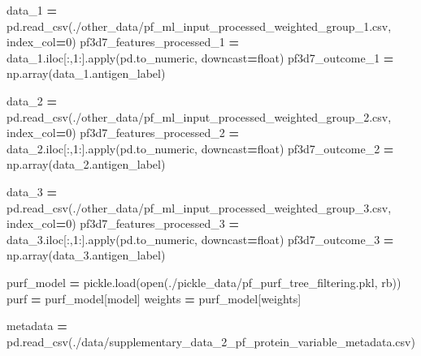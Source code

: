 \documentclass[
  11pt,
  oneside]{book}
\newenvironment{Shaded}{\begin{snugshade}}{\end{snugshade}}
\newcommand{\BuiltInTok}[1]{#1}
\newcommand{\DecValTok}[1]{\textcolor[rgb]{0.00,0.00,0.81}{#1}}
\newcommand{\NormalTok}[1]{#1}
\newcommand{\OperatorTok}[1]{\textcolor[rgb]{0.81,0.36,0.00}{\textbf{#1}}}
\newcommand{\StringTok}[1]{\textcolor[rgb]{0.31,0.60,0.02}{#1}}
\begin{document}
\begin{Shaded}
\begin{Highlighting}[]
\NormalTok{data\_1 }\OperatorTok{=}\NormalTok{ pd.read\_csv(}\StringTok{\textquotesingle{}./other\_data/pf\_ml\_input\_processed\_weighted\_group\_1.csv\textquotesingle{}}\NormalTok{, index\_col}\OperatorTok{=}\DecValTok{0}\NormalTok{)}
\NormalTok{pf3d7\_features\_processed\_1 }\OperatorTok{=}\NormalTok{ data\_1.iloc[:,}\DecValTok{1}\NormalTok{:].}\BuiltInTok{apply}\NormalTok{(pd.to\_numeric, downcast}\OperatorTok{=}\StringTok{\textquotesingle{}float\textquotesingle{}}\NormalTok{)}
\NormalTok{pf3d7\_outcome\_1 }\OperatorTok{=}\NormalTok{ np.array(data\_1.antigen\_label)}

\NormalTok{data\_2 }\OperatorTok{=}\NormalTok{ pd.read\_csv(}\StringTok{\textquotesingle{}./other\_data/pf\_ml\_input\_processed\_weighted\_group\_2.csv\textquotesingle{}}\NormalTok{, index\_col}\OperatorTok{=}\DecValTok{0}\NormalTok{)}
\NormalTok{pf3d7\_features\_processed\_2 }\OperatorTok{=}\NormalTok{ data\_2.iloc[:,}\DecValTok{1}\NormalTok{:].}\BuiltInTok{apply}\NormalTok{(pd.to\_numeric, downcast}\OperatorTok{=}\StringTok{\textquotesingle{}float\textquotesingle{}}\NormalTok{)}
\NormalTok{pf3d7\_outcome\_2 }\OperatorTok{=}\NormalTok{ np.array(data\_2.antigen\_label)}

\NormalTok{data\_3 }\OperatorTok{=}\NormalTok{ pd.read\_csv(}\StringTok{\textquotesingle{}./other\_data/pf\_ml\_input\_processed\_weighted\_group\_3.csv\textquotesingle{}}\NormalTok{, index\_col}\OperatorTok{=}\DecValTok{0}\NormalTok{)}
\NormalTok{pf3d7\_features\_processed\_3 }\OperatorTok{=}\NormalTok{ data\_3.iloc[:,}\DecValTok{1}\NormalTok{:].}\BuiltInTok{apply}\NormalTok{(pd.to\_numeric, downcast}\OperatorTok{=}\StringTok{\textquotesingle{}float\textquotesingle{}}\NormalTok{)}
\NormalTok{pf3d7\_outcome\_3 }\OperatorTok{=}\NormalTok{ np.array(data\_3.antigen\_label)}

\NormalTok{purf\_model }\OperatorTok{=}\NormalTok{ pickle.load(}\BuiltInTok{open}\NormalTok{(}\StringTok{\textquotesingle{}./pickle\_data/pf\_purf\_tree\_filtering.pkl\textquotesingle{}}\NormalTok{, }\StringTok{\textquotesingle{}rb\textquotesingle{}}\NormalTok{))}
\NormalTok{purf }\OperatorTok{=}\NormalTok{ purf\_model[}\StringTok{\textquotesingle{}model\textquotesingle{}}\NormalTok{]}
\NormalTok{weights }\OperatorTok{=}\NormalTok{ purf\_model[}\StringTok{\textquotesingle{}weights\textquotesingle{}}\NormalTok{]}

\NormalTok{metadata }\OperatorTok{=}\NormalTok{ pd.read\_csv(}\StringTok{\textquotesingle{}./data/supplementary\_data\_2\_pf\_protein\_variable\_metadata.csv\textquotesingle{}}\NormalTok{)}
\end{Highlighting}
\end{Shaded}
\end{document}
